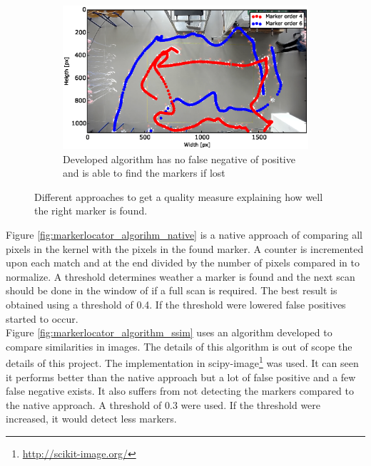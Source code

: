 \begin{figure}[H]
    ~
    \begin{subfigure}[b]{0.3\textwidth}
        \includegraphics[width=\textwidth]{graphics/markerlocator_match_order.eps}
        \caption{Developed algorithm has no false negative of positive and is able to find the markers if lost}
        \label{fig:markerlocator_algorithm_order_match}
    \end{subfigure}
    \caption{Different approaches to get a quality measure explaining how well the right marker is found.}\label{fig:markerlocator_algorithms}
\end{figure}

Figure \ref{fig:markerlocator_algorihm_native} is a native approach of comparing all pixels in the kernel with the pixels in the found marker. A counter is incremented upon each match and at the end divided by the number of pixels compared in to normalize. A threshold determines weather a marker is found and the next scan should be done in the window of if a full scan is required. The best result is obtained using a threshold of 0.4. If the threshold were lowered false positives started to occur. \\

Figure \ref{fig:markerlocator_algorithm_ssim} uses an algorithm developed to compare similarities in images. 
The details of this algorithm is out of scope the details of this project. The implementation in scipy-image\footnote{\url{http://scikit-image.org/}} was used.
It can seen it performs better than the native approach but a lot of false positive and a few false negative exists. It also suffers from not detecting the markers compared to the native approach. A threshold of 0.3 were used. If the threshold were increased, it would detect less markers. \\

